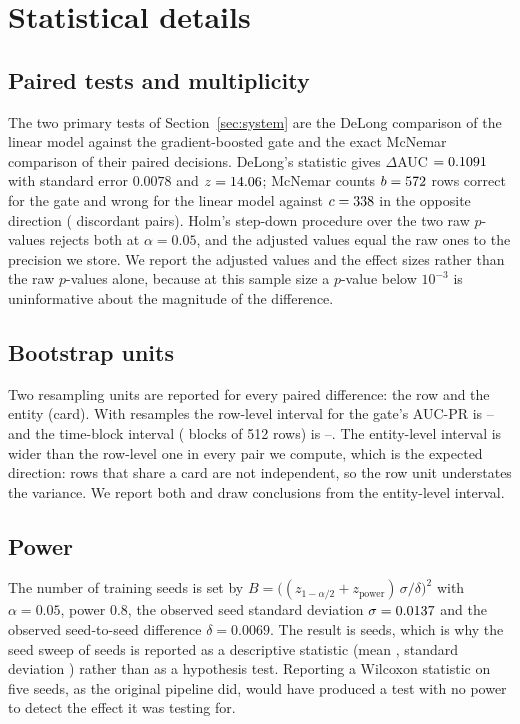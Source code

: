 \section{Statistical details}\label{app:tables}

\subsection*{Paired tests and multiplicity}

The two primary tests of Section~\ref{sec:system} are the DeLong comparison of the
linear model against the gradient-boosted gate and the exact McNemar comparison of
their paired decisions. DeLong's statistic gives $\Delta$AUC $=0.1091$ with
standard error $0.0078$ and $z=14.06$; McNemar counts $b=572$ rows
correct for the gate and wrong for the linear model against $c=338$ in the
opposite direction (\McNemarDiscordant{} discordant pairs). Holm's step-down
procedure over the two raw $p$-values rejects both at $\alpha=0.05$, and the
adjusted values equal the raw ones to the precision we store. We report the
adjusted values and the effect sizes rather than the raw $p$-values alone, because
at this sample size a $p$-value below $10^{-3}$ is uninformative about the
magnitude of the difference.

\subsection*{Bootstrap units}

Two resampling units are reported for every paired difference: the row and the
entity (card). With \BootstrapB{} resamples the row-level interval for the gate's
AUC-PR is \ClusterCiLo--\ClusterCiHi{} and the time-block interval
(\BootstrapBlocks{} blocks of 512 rows) is \BlockCiLo--\BlockCiHi. The entity-level
interval is wider than the row-level one in every pair we compute, which is the
expected direction: rows that share a card are not independent, so the row unit
understates the variance. We report both and draw conclusions from the entity-level
interval.

\subsection*{Power}

The number of training seeds is set by
$B=\big((z_{1-\alpha/2}+z_{\text{power}})\,\sigma/\delta\big)^2$ with
$\alpha=0.05$, power $0.8$, the observed seed standard deviation
$\sigma=0.0137$ and the observed seed-to-seed difference
$\delta=0.0069$. The result is \RequiredSeeds{} seeds, which is why the seed sweep
of \SeedN{} seeds is reported as a descriptive statistic (mean \SeedMean, standard
deviation \SeedSd) rather than as a hypothesis test. Reporting a Wilcoxon statistic
on five seeds, as the original pipeline did, would have produced a test with no
power to detect the effect it was testing for.

